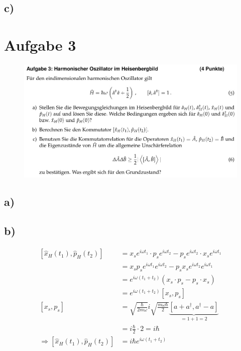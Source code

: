 \subsection{c)}

\section{Aufgabe 3}

    \begin{figure}[H]
        \centering
        \includegraphics[width=\textwidth]{images/Aufgabe3.jpg}
        \label{fig:4}
    \end{figure}

\subsection{a)}

\subsection{b)}

    \begin{align*}
        \left[ \hat{x}_H(t_1),\hat{p}_H(t_2) \right] &= x_s e^{i\omega t_1} \cdot p_s e^{i\omega t_2} - p_s e^{i\omega t_2} \cdot x_s e^{i\omega t_1}\\
        &= x_s p_s e^{i\omega t_1} e^{i\omega t_2} - p_s x_s e^{i\omega t_2} e^{i\omega t_1}\\
        &= e^{i\omega (t_1+t_2)} (x_s \cdot p_s - p_s \cdot x_s)\\
        &= e^{i\omega (t_1+t_2)}[x_s,p_s]\\
        [x_s,p_s] &= \sqrt{\frac{\hbar}{2m\omega}}i \sqrt{\frac{m\omega\hbar}{2}} \underbrace{[a+a^{\dagger},a^{\dagger}-a]}_{=1+1=2}\\
        &= i\frac{\hbar}{2} \cdot 2 = i\hbar\\
        \Rightarrow \left[ \hat{x}_H(t_1),\hat{p}_H(t_2) \right] &= i\hbar e^{i\omega (t_1+t_2)}
    \end{align*}

